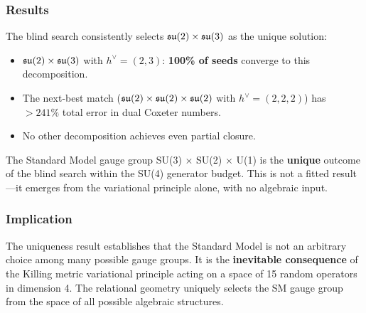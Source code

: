 \subsubsection{Results}

The blind search consistently selects $\mathfrak{su}(2) \times \mathfrak{su}(3)$ as the unique solution:

\begin{itemize}
\item $\mathfrak{su}(2) \times \mathfrak{su}(3)$ with $h^\vee = (2, 3)$: \textbf{100\% of seeds} converge to this decomposition.
\item The next-best match ($\mathfrak{su}(2) \times \mathfrak{su}(2) \times \mathfrak{su}(2)$ with $h^\vee = (2, 2, 2)$) has $> 241\%$ total error in dual Coxeter numbers.
\item No other decomposition achieves even partial closure.
\end{itemize}

The Standard Model gauge group SU(3) $\times$ SU(2) $\times$ U(1) is the \textbf{unique} outcome of the blind search within the SU(4) generator budget. This is not a fitted result---it emerges from the variational principle alone, with no algebraic input.

\subsubsection{Implication}

The uniqueness result establishes that the Standard Model is not an arbitrary choice among many possible gauge groups. It is the \textbf{inevitable consequence} of the Killing metric variational principle acting on a space of 15 random operators in dimension 4. The relational geometry uniquely selects the SM gauge group from the space of all possible algebraic structures.
